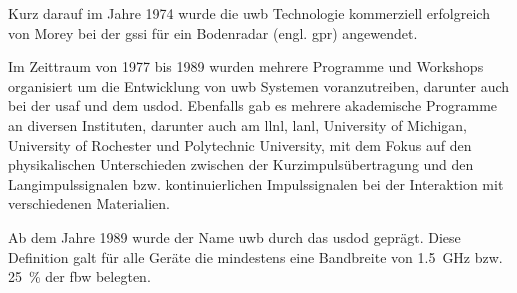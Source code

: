 

Kurz darauf im Jahre 1974 wurde die \gls{uwb} Technologie kommerziell erfolgreich von Morey bei der \gls{gssi} für ein Bodenradar (engl. \acrfull{gpr}) angewendet. \cite{barrett2001technical}

Im Zeittraum von 1977 bis 1989 wurden mehrere Programme und Workshops organisiert um die Entwicklung von \gls{uwb} Systemen voranzutreiben, darunter auch bei der \gls{usaf} und dem \gls{usdod}. Ebenfalls gab es mehrere akademische Programme an diversen Instituten, darunter auch am \gls{llnl}, \gls{lanl}, University of Michigan, University of Rochester und
Polytechnic University, mit dem Fokus auf den physikalischen Unterschieden zwischen der Kurzimpulsübertragung und den Langimpulssignalen bzw. kontinuierlichen Impulssignalen bei der Interaktion mit verschiedenen Materialien.\cite{barrett2001technical}


Ab dem Jahre 1989 wurde der Name \gls{uwb}\footnotemark{} durch das \gls{usdod} geprägt. Diese Definition galt für alle Geräte die mindestens eine Bandbreite von \SI{1.5}{\GHz} bzw. \SI{25}{\percent} der \gls{fbw} belegten. \cite{eltaher2004positioning, fowler1990assessment, yang2004uwbcom, aiello2006ultra, fontana2004recent}



